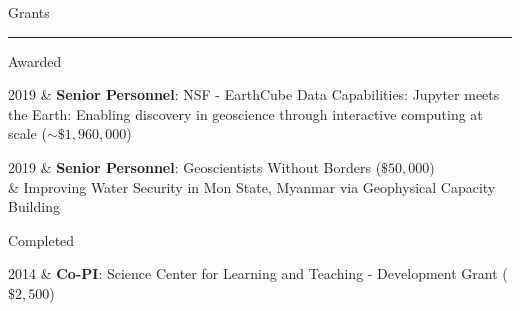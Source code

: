 \documentclass[a4paper, 11pt]{article}
\newcommand{\heading}[1]{
    \begin{minipage}[t]{\textwidth}
    \vspace{0.05cm}
    {\Large #1}\\
    \vspace{-0.35cm}
    \hrule
    \end{minipage}
    \vspace{0.1cm}
}
\newcommand{\subheading}[1]{
    \vspace{-0.1cm}
    {\large #1}\\
    \vspace{-0.3cm}
}
\begin{document}




\heading{Grants}


\subheading{Awarded}
\begin{entryrighttight}
2019 & \textbf{Senior Personnel}: NSF - EarthCube Data Capabilities: Jupyter meets the Earth: Enabling discovery in geoscience through interactive computing at scale ($\sim\$1,960,000$) \\
\end{entryrighttight}

\begin{entryrighttight}
2019 & \textbf{Senior Personnel}: Geoscientists Without Borders ($\$50,000$) \\
& Improving Water Security in Mon State, Myanmar via Geophysical Capacity Building \\
\end{entryrighttight}


\subheading{Completed}
\begin{entryrighttight}
2014 & \textbf{Co-PI}: Science Center for Learning and Teaching - Development Grant ($\$2,500$) \\
\end{entryrighttight}
\end{document}
